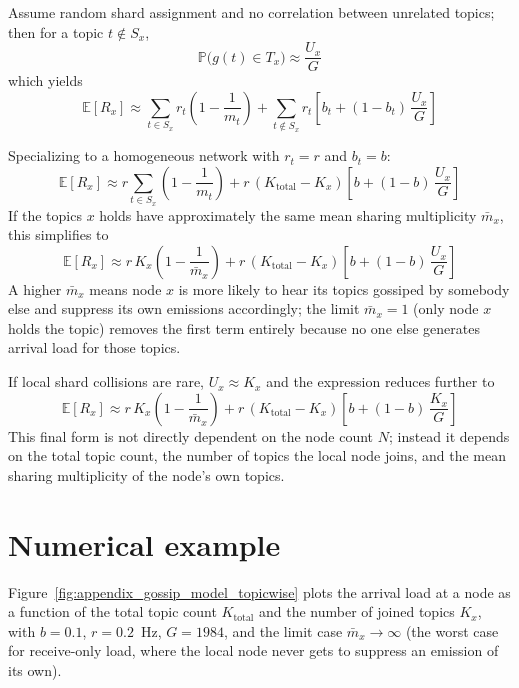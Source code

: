 Assume random shard assignment and no correlation between unrelated topics;
then for a topic $t \notin S_x$,
\begin{equation*}
    \mathbb{P}\bigl(g(t) \in T_x\bigr) \approx \frac{U_x}{G}
\end{equation*}
which yields
\begin{equation*}
    \mathbb{E}[R_x] \approx
    \sum_{t \in S_x} r_t \left(1 - \frac{1}{m_t}\right)
    + \sum_{t \notin S_x} r_t
      \left[ b_t + (1 - b_t)\,\frac{U_x}{G} \right]
\end{equation*}

Specializing to a homogeneous network with $r_t = r$ and $b_t = b$:
\begin{equation*}
    \mathbb{E}[R_x] \approx
    r \sum_{t \in S_x}\left(1 - \frac{1}{m_t}\right)
    + r\,(K_{\text{total}} - K_x)
      \left[ b + (1 - b)\,\frac{U_x}{G} \right]
\end{equation*}
If the topics $x$ holds have approximately the same mean sharing multiplicity
$\bar m_x$, this simplifies to
\begin{equation*}
    \mathbb{E}[R_x] \approx
    r\,K_x\left(1 - \frac{1}{\bar m_x}\right)
    + r\,(K_{\text{total}} - K_x)
      \left[ b + (1 - b)\,\frac{U_x}{G} \right]
\end{equation*}
A higher $\bar m_x$ means node $x$ is more likely to hear its topics
gossiped by somebody else and suppress its own emissions accordingly; the
limit $\bar m_x = 1$ (only node $x$ holds the topic) removes the first term
entirely because no one else generates arrival load for those topics.

If local shard collisions are rare, $U_x \approx K_x$ and the expression
reduces further to
\begin{equation*}
    \mathbb{E}[R_x] \approx
    r\,K_x\left(1 - \frac{1}{\bar m_x}\right)
    + r\,(K_{\text{total}} - K_x)
      \left[ b + (1 - b)\,\frac{K_x}{G} \right]
\end{equation*}
This final form is not directly dependent on the node count $N$; instead it
depends on the total topic count, the number of topics the local node joins,
and the mean sharing multiplicity of the node's own topics.

\section{Numerical example}

Figure~\ref{fig:appendix_gossip_model_topicwise} plots the arrival load at a
node as a function of the total topic count $K_{\text{total}}$ and the
number of joined topics $K_x$, with $b = 0.1$, $r = 0.2$~Hz, $G = 1984$, and
the limit case $\bar m_x \to \infty$ (the worst case for receive-only load,
where the local node never gets to suppress an emission of its own).

